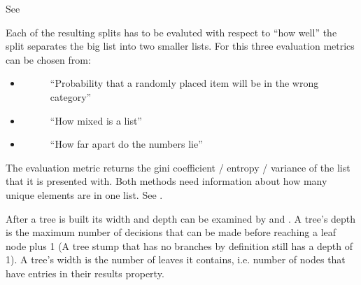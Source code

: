 \documentclass[letterpaper,10pt,english]{sphinxmanual}
\begin{document}
See {\hyperref[\detokenize{DT:divideset}]{}}

Each of the resulting splits has to be evaluted with respect to ``how well'' the split separates the big list into two smaller lists.
For this three evaluation metrics can be chosen from:
\begin{itemize}
\item {} \begin{description}
\item[{{\hyperref[\detokenize{DT:giniimpurity}]{}}}] \leavevmode
``Probability that a randomly placed item will be in the wrong category''

\end{description}

\item {} \begin{description}
\item[{{\hyperref[\detokenize{DT:entropy}]{}}}] \leavevmode
``How mixed is a list''

\end{description}

\item {} \begin{description}
\item[{{\hyperref[\detokenize{DT:variance}]{}}}] \leavevmode
``How far apart do the numbers lie''

\end{description}

\end{itemize}

The evaluation metric returns the gini coefficient / entropy / variance of the list that it is presented with.
Both methods need information about how many unique elements are in one list.
See {\hyperref[\detokenize{DT:uniquecounts}]{}}.

After a tree is built its width and depth can be examined by {\hyperref[\detokenize{DT:getdepth}]{}} and {\hyperref[\detokenize{DT:getwidth}]{}}.
A tree's depth is the maximum number of decisions that can be made before reaching a leaf node plus 1 (A tree stump that has no branches by definition still has a depth of 1).
A tree's width is the number of leaves it contains, i.e. number of nodes that have entries in their results property.
\end{document}
